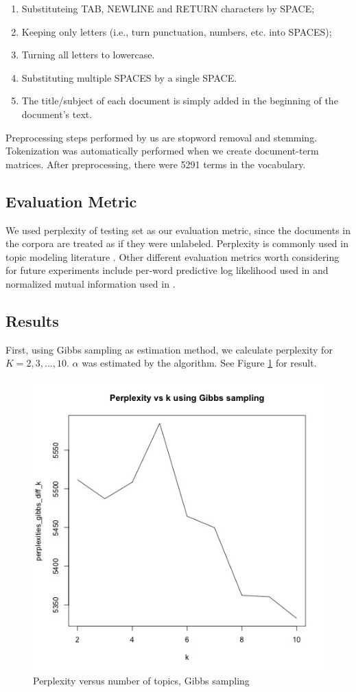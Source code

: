 \documentclass{article}
\begin{document}
\begin{enumerate}
  \item Substituteing TAB, NEWLINE and RETURN characters by SPACE;
  \item Keeping only letters (i.e., turn punctuation, numbers, etc. into SPACES);
  \item Turning all letters to lowercase.
  \item Substituting multiple SPACES by a single SPACE.
  \item The title/subject of each document is simply added in the beginning of the document's text.
\end{enumerate}

Preprocessing steps performed by us are stopword removal and stemming. Tokenization was automatically performed when we create document-term matrices. After preprocessing, there were 5291 terms in the vocabulary.


\subsection{Evaluation Metric}

We used perplexity of testing set as our evaluation metric, since the documents in the corpora are treated as if they were unlabeled. Perplexity is commonly used in topic modeling literature \cite{blei2003latent,blei2007correlated}. Other different evaluation metrics worth considering for future experiments include per-word predictive log likelihood used in \cite{wang2018general} and normalized mutual information used in \cite{lu2011investigating}.


\subsection{Results}

First, using Gibbs sampling as estimation method, we calculate perplexity for $K = 2, 3, ..., 10$. $\alpha$ was estimated by the algorithm. See Figure \ref{fig:gibbs_diff_k_10} for result.

\begin{figure}[h]
  \centering
  \includegraphics[width=0.5\linewidth]{images/gibbs_diff_k.jpg}
  \caption{Perplexity versus number of topics, Gibbs sampling}
  \label{fig:gibbs_diff_k_10}
\end{figure}
\end{document}
